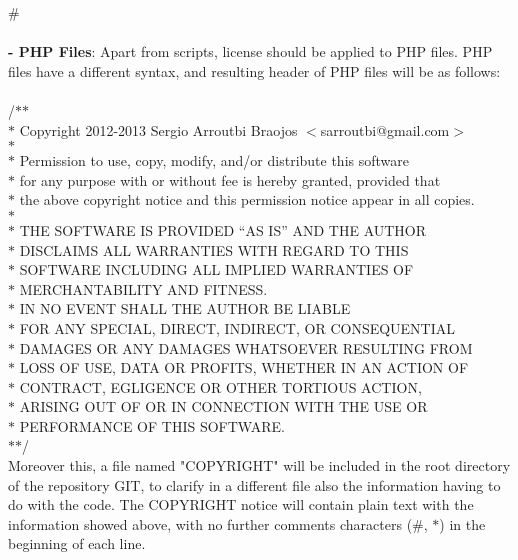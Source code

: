 \documentclass[11pt]{article}
\begin{document}
\#\\
\\
\textbf{- PHP Files}: Apart from scripts, license should be applied to PHP files. PHP files have a different syntax, and resulting header of PHP files will be as follows:\\
\\
/$*$$*$\\
$*$ Copyright 2012-2013 Sergio Arroutbi Braojos $<$sarroutbi@gmail.com$>$\\
$*$ \\
$*$ Permission to use, copy, modify, and/or distribute this software \\
$*$ for any purpose with or without fee is hereby granted, provided that \\
$*$ the above copyright notice and this permission notice appear in all copies.\\
$*$ \\
$*$ THE SOFTWARE IS PROVIDED “AS IS” AND THE AUTHOR \\
$*$ DISCLAIMS ALL WARRANTIES  WITH REGARD TO THIS \\
$*$ SOFTWARE INCLUDING ALL IMPLIED WARRANTIES OF \\
$*$ MERCHANTABILITY AND FITNESS. \\
$*$ IN NO EVENT SHALL THE AUTHOR BE LIABLE \\
$*$ FOR ANY SPECIAL, DIRECT, INDIRECT, OR CONSEQUENTIAL \\
$*$ DAMAGES OR ANY DAMAGES WHATSOEVER RESULTING FROM \\
$*$ LOSS OF USE, DATA OR PROFITS, WHETHER IN AN ACTION OF \\  
$*$ CONTRACT, EGLIGENCE OR OTHER TORTIOUS ACTION, \\ 
$*$ ARISING OUT OF OR IN CONNECTION WITH THE USE OR \\
$*$ PERFORMANCE OF THIS SOFTWARE.\\
$*$$*$/
\\
Moreover this, a file named "COPYRIGHT" will be included in the root directory of the repository GIT, to clarify in a different file also the information having to do with the code. The COPYRIGHT notice will contain plain text with the information showed above, with no further comments characters (\#, $*$) in the beginning of each line.\\
\end{document}
